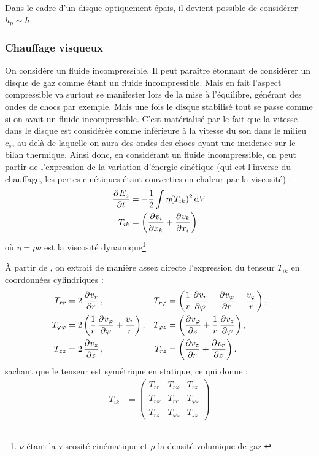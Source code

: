 Dans le cadre d'un disque optiquement épais, il devient possible de considérer $h_p \sim h$.


\subsubsection{Chauffage visqueux}
On considère un fluide incompressible. Il peut paraître étonnant de considérer un disque de gaz comme étant un fluide incompressible. Mais en fait l'aspect compressible va surtout se manifester lors de la mise à l'équilibre, générant des ondes de chocs par exemple. Mais une fois le disque stabilisé tout se passe comme si on avait un fluide incompressible. C'est matérialisé par le fait que la vitesse dans le disque est considérée comme inférieure à la vitesse du son dans le milieu $c_s$, au delà de laquelle on aura des ondes des chocs ayant une incidence sur le bilan thermique. Ainsi donc, en considérant un fluide incompressible, on peut partir de l'expression de la variation d'énergie cinétique (qui est l'inverse du chauffage, les pertes cinétiques étant converties en chaleur par la viscosité) \citep[(16.3)]{landau1989mecanique} : 
\begin{align}
\dpd{E_c}{t} &= - \frac{1}{2}\int \eta(T_{ik})^2\dif V\\
T_{ik} &= \left(\dpd{v_i}{x_k} + \dpd{v_k}{x_i}\right)\nonumber
\end{align}
où $\eta = \rho\nu$ est la viscosité dynamique\footnote{$\nu$ étant la viscosité cinématique et $\rho$ la densité volumique de gaz.}

À partir de \citep[(15.8) et (15.17)]{landau1989mecanique}, on extrait de manière assez directe l'expression du tenseur $T_{ik}$ en coordonnées cylindriques : 
\begin{align}
T_{rr} &= 2\dpd{v_r}{r}, & T_{r\varphi} &= \left(\inv{r} \dpd{v_r}{\varphi} + \dpd{v_\varphi}{r} - \frac{v_\varphi}{r}\right),\nonumber\\
T_{\varphi\varphi} &= 2 \left(\inv{r} \dpd{v_\varphi}{\varphi} + \frac{v_r}{r}\right), & T_{\varphi z} &= \left(\dpd{v_\varphi}{z} + \inv{r}\dpd{v_z}{\varphi}\right),\\
T_{zz} &= 2\dpd{v_z}{z}, & T_{rz} &= \left(\dpd{v_z}{r} + \dpd{v_r}{z}\right).\nonumber
\end{align}
sachant que le tenseur est symétrique en statique, ce qui donne : 
\begin{align}
T_{ik} &= \begin{pmatrix}
T_{rr} & T_{r\varphi} & T_{rz}\\
T_{r\varphi} & T_{rr} & T_{\varphi z}\\
T_{rz} & T_{\varphi z} & T_{zz}
\end{pmatrix}
\end{align}

